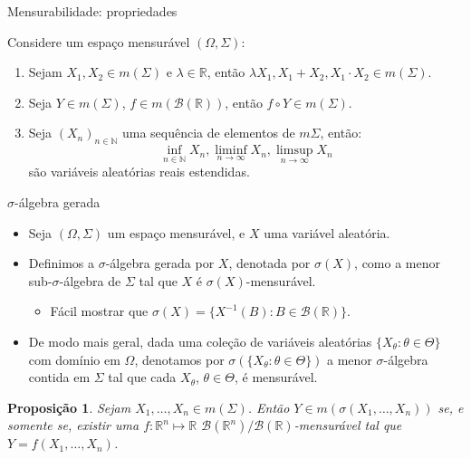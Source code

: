 \documentclass[11pt]{beamer}
\newtheorem{proposition}{Proposição}
\begin{document}
\begin{frame}{Mensurabilidade: propriedades}
	\begin{lemma}
		Considere um espaço mensurável $(\Omega, \Sigma)$:
		\begin{enumerate}
			\item Sejam $X_1,X_2 \in m(\Sigma)$ e $\lambda \in \mathbb{R}$, então $\lambda X_1, X_1 + X_2, X_1 \cdot X_2 \in m(\Sigma)$.
			\item Seja $Y \in m(\Sigma)$, $f \in m(\mathcal{B}(\mathbb{R}))$, então $f\circ Y  \in m(\Sigma)$.
			\item Seja $(X_n)_{n\in \mathbb{N}}$ uma sequência de elementos de $m\Sigma$, então:
				$$\inf_{n \in \mathbb{N}} X_n, \liminf_{n\to \infty} X_n, \limsup_{n \to \infty}X_n$$ 
				são variáveis aleatórias reais estendidas.
			\end{enumerate}
		\end{lemma}
	\end{frame}


\begin{frame}{$\sigma$-álgebra gerada}
	\begin{itemize}
		\item 	Seja $(\Omega, \Sigma )$ um espaço mensurável, e $X$ uma variável aleatória.
		\item Definimos a $\sigma$-álgebra gerada por $X$, denotada por $\sigma(X)$, como a menor sub-$\sigma$-álgebra de $\Sigma$ tal que $X$ é $\sigma(X)$-mensurável.
		\begin{itemize}
			\item Fácil mostrar que $\sigma(X) = \{X^{-1}(B): B \in \mathcal{B}(\mathbb{R})\}$.
		\end{itemize}
		\item De modo mais geral, dada uma coleção de variáveis aleatórias $\{X_\theta: \theta \in \Theta\}$ com domínio em $\Omega$, denotamos por $\sigma(\{X_\theta: \theta \in \Theta\})$ a menor $\sigma$-álgebra contida em $\Sigma$ tal que cada $X_\theta$, $\theta \in \Theta$, é mensurável.
		
			\end{itemize}
\begin{proposition}
	Sejam $X_1,\ldots, X_n \in m(\Sigma)$. Então $Y \in m(\sigma(X_1,\ldots, X_n))$ se, e somente se, existir uma $f: \mathbb{R}^n \mapsto \mathbb{R}$ $\mathcal{B}(\mathbb{R}^n)\slash \mathcal{B}(\mathbb{R})$-mensurável tal que $Y = f(X_1,\ldots, X_n)$.
\end{proposition}

\end{frame}
\end{document}
